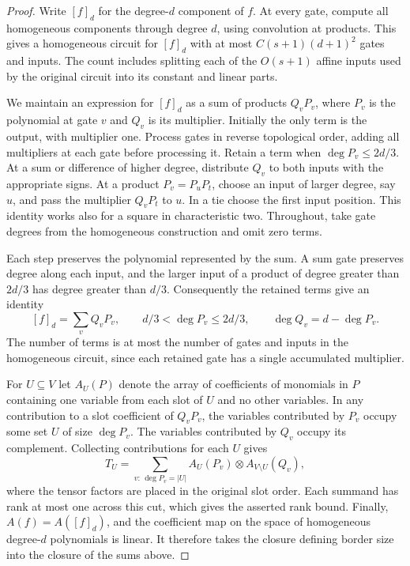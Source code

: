 \begin{proof}
Write $[f]_d$ for the degree-$d$ component of $f$. At every gate,
compute all homogeneous components through degree $d$, using
convolution at products. This gives a homogeneous circuit for $[f]_d$
with at most $C(s+1)(d+1)^2$ gates and inputs. The count includes
splitting each of the $O(s+1)$ affine inputs used by the original
circuit into its constant and linear parts.

We maintain an expression for $[f]_d$ as a sum of products $Q_vP_v$,
where $P_v$ is the polynomial at gate $v$ and $Q_v$ is its multiplier.
Initially the only term is the output, with multiplier one. Process
gates in reverse topological order, adding all multipliers at each gate
before processing it. Retain a term when $\deg P_v\le 2d/3$. At a
sum or difference of higher degree, distribute $Q_v$ to both inputs
with the appropriate signs. At a product $P_v=P_uP_t$, choose an
input of larger degree, say $u$, and pass the multiplier $Q_vP_t$ to
$u$. In a tie choose the first input position. This identity works
also for a square in characteristic two. Throughout, take gate degrees
from the homogeneous construction and omit zero terms.

Each step preserves the polynomial represented by the sum. A sum gate
preserves degree along each input, and the larger input of a product
of degree greater than $2d/3$ has degree greater than $d/3$.
Consequently the retained terms give an identity
\[
 [f]_d=\sum_v Q_vP_v,\qquad d/3<\deg P_v\le 2d/3,\qquad
 \deg Q_v=d-\deg P_v .
\]
The number of terms is at most the number of gates and inputs in the
homogeneous circuit, since each retained gate has a single accumulated
multiplier.

For $U\subseteq V$ let $A_U(P)$ denote the array of coefficients of
monomials in $P$ containing one variable from each slot of $U$ and
no other variables. In any contribution to a slot coefficient of
$Q_vP_v$, the variables contributed by $P_v$ occupy some set $U$ of
size $\deg P_v$. The variables contributed by $Q_v$ occupy its
complement. Collecting contributions for each $U$ gives
\[
 T_U=\sum_{v:\,\deg P_v=|U|}
       A_U(P_v)\otimes A_{V\setminus U}(Q_v),
\]
where the tensor factors are placed in the original slot order. Each
summand has rank at most one across this cut, which gives the asserted
rank bound. Finally, $A(f)=A([f]_d)$, and the coefficient map on the
space of homogeneous degree-$d$ polynomials is linear. It therefore
takes the closure defining border size into the closure of the sums
above.
\end{proof}


